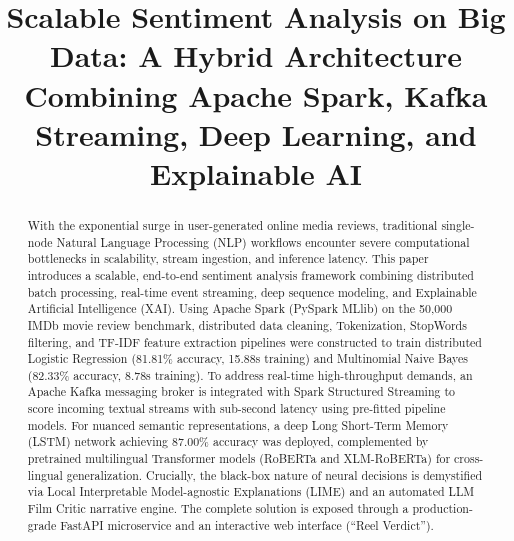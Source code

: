 \documentclass[conference]{IEEEtran}
\begin{document}
\title{Scalable Sentiment Analysis on Big Data: A Hybrid Architecture Combining Apache Spark, Kafka Streaming, Deep Learning, and Explainable AI}

\author{
\and
{}
\and
{}
}

\maketitle

\begin{abstract}
With the exponential surge in user-generated online media reviews, traditional single-node Natural Language Processing (NLP) workflows encounter severe computational bottlenecks in scalability, stream ingestion, and inference latency. This paper introduces a scalable, end-to-end sentiment analysis framework combining distributed batch processing, real-time event streaming, deep sequence modeling, and Explainable Artificial Intelligence (XAI). Using Apache Spark (PySpark MLlib) on the 50,000 IMDb movie review benchmark, distributed data cleaning, Tokenization, StopWords filtering, and TF-IDF feature extraction pipelines were constructed to train distributed Logistic Regression (81.81\% accuracy, 15.88s training) and Multinomial Naive Bayes (82.33\% accuracy, 8.78s training). To address real-time high-throughput demands, an Apache Kafka messaging broker is integrated with Spark Structured Streaming to score incoming textual streams with sub-second latency using pre-fitted pipeline models. For nuanced semantic representations, a deep Long Short-Term Memory (LSTM) network achieving 87.00\% accuracy was deployed, complemented by pretrained multilingual Transformer models (RoBERTa and XLM-RoBERTa) for cross-lingual generalization. Crucially, the black-box nature of neural decisions is demystified via Local Interpretable Model-agnostic Explanations (LIME) and an automated LLM Film Critic narrative engine. The complete solution is exposed through a production-grade FastAPI microservice and an interactive web interface (``Reel Verdict'').
\end{abstract}
\end{document}
